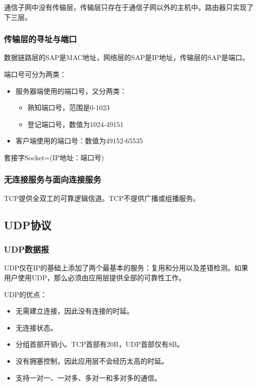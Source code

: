 \documentclass[12pt, a4paper, oneside]{ctexart}
\begin{document}
通信子网中没有传输层，传输层只存在于通信子网以外的主机中。路由器只实现了下三层。

\subsubsection{传输层的寻址与端口}

数据链路层的SAP是MAC地址，网络层的SAP是IP地址，传输层的SAP是端口。

端口号可分为两类：
\begin{itemize}
    \item 服务器端使用的端口号，又分两类：
    \begin{itemize}
        \item 熟知端口号，范围是0-1023
        \item 登记端口号，数值为1024-49151
    \end{itemize}
    \item 客户端使用的端口号：数值为49152-65535
\end{itemize}

套接字Socket=(IP地址：端口号)

\subsubsection{无连接服务与面向连接服务}

TCP提供全双工的可靠逻辑信道。TCP不提供广播或组播服务。

\subsection{UDP协议}

\subsubsection{UDP数据报}

UDP仅在IP的基础上添加了两个最基本的服务：复用和分用以及差错检测。如果用户使用UDP，那么必须由应用层提供全部的可靠性工作。

UDP的优点：
\begin{itemize}
    \item 无需建立连接，因此没有连接的时延。
    \item 无连接状态。
    \item 分组首部开销小。TCP首部有20B，UDP首部仅有8B。
    \item 没有拥塞控制，因此应用层不会经历太高的时延。
    \item 支持一对一、一对多、多对一和多对多的通信。
\end{itemize}
\end{document}
